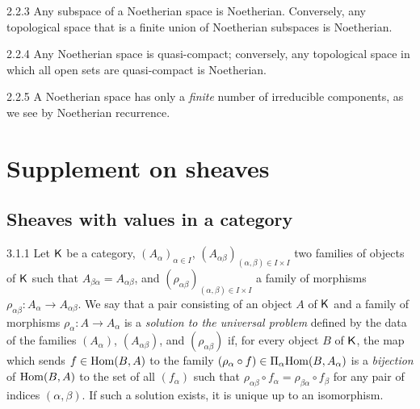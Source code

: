 \begin{env}{2.2.3}
\label{env-0.2.2.3}
Any subspace of a Noetherian space is Noetherian. Conversely, any topological
space that is a finite union of Noetherian subspaces is Noetherian.
\end{env}

\begin{env}{2.2.4}
\label{env-0.2.2.4}
Any Noetherian space is quasi-compact; conversely, any topological space in
which all open sets are quasi-compact is Noetherian.
\end{env}

\begin{env}{2.2.5}
\label{env-0.2.2.5}
A Noetherian space has only a \emph{finite} number of irreducible components, as
we see by Noetherian recurrence.
\end{env}

\section{Supplement on sheaves}
\label{0-prelim-3}

\subsection{Sheaves with values in a category}
\label{0-prelim-3.1}

\begin{env}{3.1.1}
\label{env-0.3.1.1}
Let $\mathsf{K}$ be a category, $(A_\alpha)_{\alpha\in I}$,
$(A_{\alpha\beta})_{(\alpha,\beta)\in I\times I}$ two families of objects of
$\mathsf{K}$ such that $A_{\beta\alpha}=A_{\alpha\beta}$, and
$(\rho_{\alpha\beta})_{(\alpha,\beta)\in I\times I}$ a family of morphisms
$\rho_{\alpha\beta}:A_\alpha\to A_{\alpha\beta}$. We say that a pair consisting
of an object $A$ of $\mathsf{K}$ and a family of morphisms $\rho_\alpha:A\to A_\alpha$
is a \emph{solution to the universal problem} defined by the data of the
families $(A_\alpha)$, $(A_{\alpha\beta})$, and $(\rho_{\alpha\beta})$ if, for
every object $B$ of $\mathsf{K}$, the map which sends $f\in{\mathop{\mathrm{Hom}}\nolimits}(B,A)$ to the family
$(\rho_\alpha\circ f)\in\Pi_\alpha{\mathop{\mathrm{Hom}}\nolimits}(B,A_\alpha)$ is a \emph{bijection} of
${\mathop{\mathrm{Hom}}\nolimits}(B,A)$ to the set of all $(f_\alpha)$ such that
$\rho_{\alpha\beta}\circ f_\alpha=\rho_{\beta\alpha}\circ f_\beta$ for any pair
of indices $(\alpha,\beta)$. If such a solution exists, it is unique up to an
isomorphism.
\end{env}

